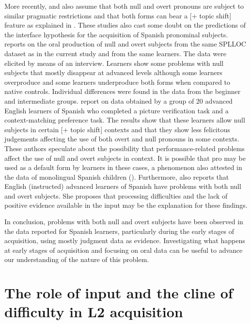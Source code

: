 \documentclass[output=paper]{langscibook}
\begin{document}
More recently, \citet{Dominguez2013} and \citet{ClementsDomínguez2017} also assume that both null and overt pronouns are subject to similar pragmatic restrictions and that both forms can bear a [+ topic shift] feature as explained in . These studies also cast some doubt on the predictions of the interface hypothesis for the acquisition of Spanish pronominal subjects. \citet{Dominguez2013} reports on the oral production of null and overt subjects from the same SPLLOC dataset as in the current study and from the same learners. The data were elicited by means of an interview. Learners show some problems with null subjects that mostly disappear at advanced levels although some learners overproduce and some learners underproduce both forms when compared to native controls. Individual differences were found in the data from the beginner and intermediate groups. \citet{ClementsDomínguez2017} report on data obtained by a group of 20 advanced English learners of Spanish who completed a picture verification task and a context-matching preference task. The results show that these learners allow null subjects in certain [+ topic shift] contexts and that they show less felicitous judgements affecting the use of both overt and null pronouns in some contexts. These authors speculate about the possibility that performance-related problems affect the use of null and overt subjects in context. It is possible that pro may be used as a default form by learners in these cases, a phenomenon also attested in the data of monolingual Spanish children (\citealt{Grinstead1998,Villa-Garcia2013}). Furthermore, \citet{Pladevall2013} also reports that English (instructed) advanced learners of Spanish have problems with both null and overt subjects. She proposes that processing difficulties and the lack of positive evidence available in the input may be the explanation for these findings.

In conclusion, problems with both null and overt subjects have been observed in the data reported for Spanish learners, particularly during the early stages of acquisition, using mostly judgment data as evidence. Investigating what happens at early stages of acquisition and focusing on oral data can be useful to advance our understanding of the nature of this problem.

\section{The role of input and the cline of difficulty in L2 acquisition}
\end{document}
